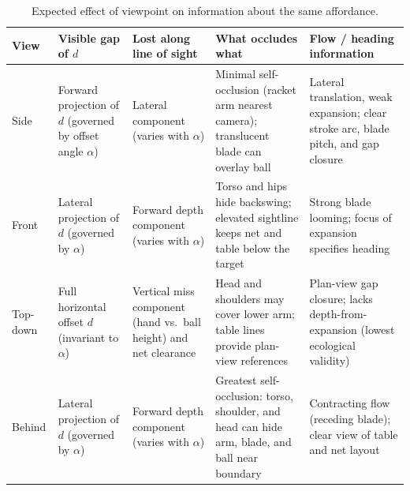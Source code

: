 \begin{table}[t]
    \centering
    \caption{Expected effect of viewpoint on information about the same affordance.}\label{tab:viewpoints}
    \footnotesize
    \setlength{\tabcolsep}{3pt}
    \begin{tabular}{@{}R{1.4cm} R{2.9cm} R{2.4cm} R{5.2cm} R{4.2cm}@{}}
        \toprule
        \textbf{View} & \textbf{Visible gap of $d$}                                   & \textbf{Lost along line of sight}                                 & \textbf{What occludes what}                                                                    & \textbf{Flow / heading information}                                                 \\
        \midrule
        Side          & Forward projection of $d$ (governed by offset angle $\alpha$) & Lateral component (varies with $\alpha$)                          & Minimal self-occlusion (racket arm nearest camera); translucent blade can overlay ball         & Lateral translation, weak expansion; clear stroke arc, blade pitch, and gap closure \\
        Front         & Lateral projection of $d$ (governed by $\alpha$)              & Forward depth component (varies with $\alpha$)                    & Torso and hips hide backswing; elevated sightline keeps net and table below the target         & Strong blade looming; focus of expansion specifies heading                          \\
        Top-down      & Full horizontal offset $d$ (invariant to $\alpha$)            & Vertical miss component (hand vs.\ ball height) and net clearance & Head and shoulders may cover lower arm; table lines provide plan-view references               & Plan-view gap closure; lacks depth-from-expansion (lowest ecological validity)      \\
        Behind        & Lateral projection of $d$ (governed by $\alpha$)              & Forward depth component (varies with $\alpha$)                    & Greatest self-occlusion: torso, shoulder, and head can hide arm, blade, and ball near boundary & Contracting flow (receding blade); clear view of table and net layout               \\
        \bottomrule
    \end{tabular}
\end{table}